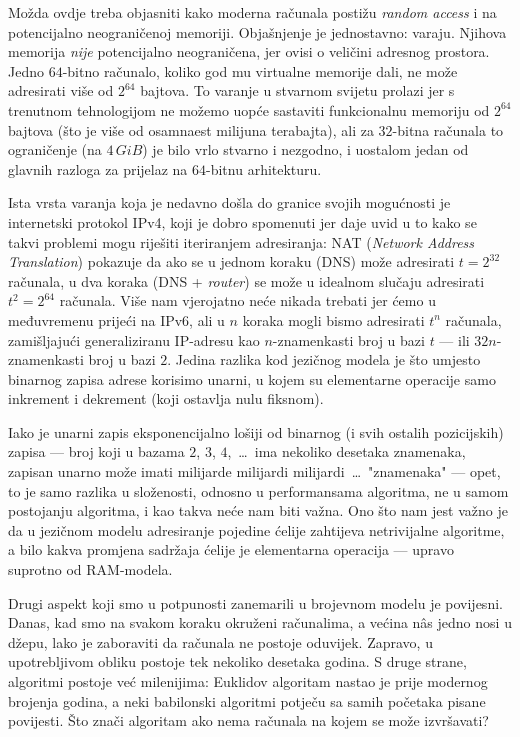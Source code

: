 Možda ovdje treba objasniti kako moderna računala postižu \emph{random access} i na potencijalno neograničenoj memoriji. Objašnjenje je jednostavno: varaju. Njihova memorija \emph{nije} potencijalno neograničena, jer ovisi o veličini adresnog prostora. Jedno $64$-bitno računalo, koliko god mu virtualne memorije dali, ne može adresirati više od $2^{64}$ bajtova. To varanje u stvarnom svijetu prolazi jer s trenutnom tehnologijom ne možemo uopće sastaviti funkcionalnu memoriju od $2^{64}$ bajtova (što je više od osamnaest milijuna terabajta), ali za $32$-bitna računala to ograničenje (na $4\,GiB$) je bilo vrlo stvarno i nezgodno, i uostalom jedan od glavnih razloga za prijelaz na $64$-bitnu arhitekturu.

Ista vrsta varanja koja je nedavno došla do granice svojih mogućnosti je internetski protokol IPv4, koji je dobro spomenuti jer daje uvid u to kako se takvi problemi mogu riješiti iteriranjem adresiranja: NAT (\emph{Network Address Translation}) pokazuje da ako se u jednom koraku (DNS) može adresirati $t=2^{32}$ računala, u dva koraka (DNS + \emph{router}) se može u idealnom slučaju adresirati $t^2=2^{64}$ računala. Više nam vjerojatno neće nikada trebati jer ćemo u međuvremenu prijeći na IPv6, ali u $n$ koraka mogli bismo adresirati $t^n$ računala, zamišljajući generaliziranu IP-adresu kao $n$-znamenkasti broj u bazi $t$ --- ili $32n$-znamenkasti broj u bazi $2$. Jedina razlika kod jezičnog modela je što umjesto binarnog zapisa adrese korisimo unarni, u kojem su elementarne operacije samo inkrement i dekrement (koji ostavlja nulu fiksnom).

Iako je unarni zapis eksponencijalno lošiji od binarnog (i svih ostalih pozicijskih) zapisa --- broj koji u bazama $2$, $3$, $4$,~\ldots\ ima nekoliko desetaka znamenaka, zapisan unarno može imati milijarde milijardi milijardi~\ldots\ "znamenaka" --- opet, to je samo razlika u složenosti, odnosno u performansama algoritma, ne u samom postojanju algoritma, i kao takva neće nam biti važna. Ono što nam jest važno je da u jezičnom modelu adresiranje pojedine ćelije zahtijeva netrivijalne algoritme, a bilo kakva promjena sadržaja ćelije je elementarna operacija --- upravo suprotno od RAM-modela.


Drugi aspekt koji smo u potpunosti zanemarili u brojevnom modelu je povijesni. Danas, kad smo na svakom koraku okruženi računalima, a većina nâs jedno nosi u džepu, lako je zaboraviti da računala ne postoje oduvijek. Zapravo, u upotrebljivom obliku postoje tek nekoliko desetaka godina. S druge strane, algoritmi postoje već milenijima: Euklidov algoritam nastao je prije modernog brojenja godina, a neki babilonski algoritmi potječu sa samih početaka pisane povijesti. Što znači algoritam ako nema računala na kojem se može izvršavati?

